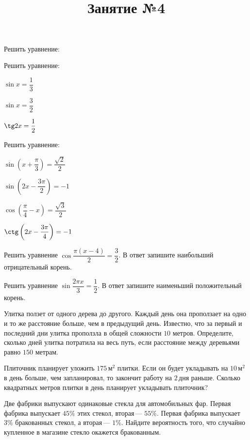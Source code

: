 \newpage
\title{Занятие №4}
\begin{listofex}
		\item Решить уравнение:
	\begin{enumcols}[itemcolumns=2]
		\item {}
		\item {}
		\item {}
		\item {}
		\item {}
		\item {}
		\item {}
	\end{enumcols}
	\item Решить уравнение:
	\begin{enumcols}[itemcolumns=3]
		\item \( \sin x = \dfrac{1}{3} \)
		\item \( \sin x = \dfrac{3}{2}\)
		\item \( \tg 2x = \dfrac{1}{2}\)
	\end{enumcols}
	\item Решить уравнение:
	\begin{enumcols}[itemcolumns=2]
		\item \( \sin \left( x+\dfrac{\pi}{3} \right) = \dfrac{\sqrt{2}}{2} \)
		\item \( \sin \left( 2x-\dfrac{3\pi}{2} \right) = -1 \)
		\item \( \cos \left( \dfrac{\pi}{4}-x \right)=\dfrac{\sqrt{3}}{2} \)
		\item \( \ctg\left( 2x-\dfrac{3\pi}{4} \right)=-1 \)
	\end{enumcols}
	\item Решить уравнение \( \cos\dfrac{\pi(x-4)}{2}=\dfrac{3}{2} \). В ответ запишите наибольший отрицательный корень.
	\item Решить уравнение \( \sin\dfrac{2\pi x}{3}=\dfrac{1}{2} \). В ответ запишите наименьший положительный корень.
	\item {}
	\item Улитка ползет от одного дерева до другого. Каждый день она проползает на одно и то же расстояние больше, чем в предыдущий день. Известно, что за первый и последний дни улитка проползла в общей сложности \( 10 \) метров. Определите, сколько дней улитка потратила на весь путь, если расстояние между деревьями равно \( 150 \) метрам.
	\item Плиточник планирует уложить \( 175 \) м\( ^2 \) плитки. Если он будет укладывать на \( 10 \) м\( ^2 \) в день больше, чем запланировал, то закончит работу на \( 2 \) дня раньше. Сколько квадратных метров плитки в день планирует укладывать плиточник? 
	\item Две фабрики выпускают одинаковые стекла для автомобильных фар. Первая фабрика выпускает \( 45\% \) этих стекол, вторая --- \( 55\% \). Первая фабрика выпускает \( 3\% \) бракованных стекол, а вторая — \( 1\% \). Найдите вероятность того, что случайно купленное в магазине стекло окажется бракованным.
\end{listofex}
